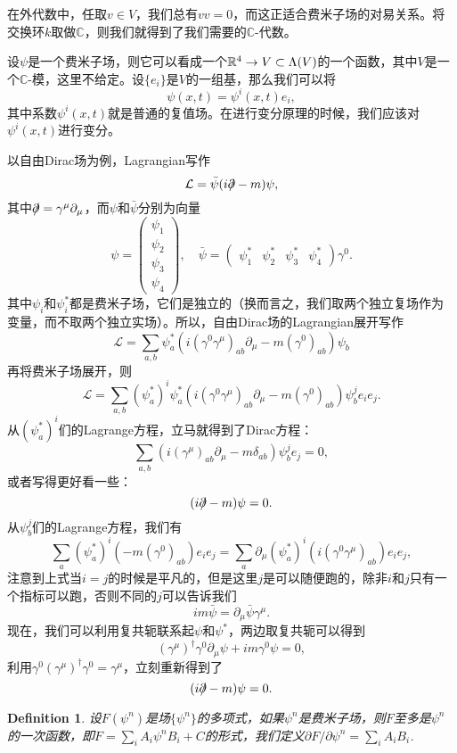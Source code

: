 \documentclass[11pt]{article}
\theoremstyle{definition}
\theoremstyle{plain}
\newtheorem{defi}[para]{Definition}
\begin{document}
在外代数中，任取$v\in V$，我们总有$vv=0$，而这正适合费米子场的对易关系。将交换环$k$取做$\mathbb C$，则我们就得到了我们需要的$\mathbb C$-代数。

设$\psi$是一个费米子场，则它可以看成一个$\mathbb{R}^4\to V\subset \Lambda(V)$的一个函数，其中$V$是一个$\mathbb C$-模，这里不给定。设$\{e_i\}$是$V$的一组基，那么我们可以将
\[
	\psi(x,t)=\psi^i(x,t)e_i,
\]
其中系数$\psi^i(x,t)$就是普通的复值场。在进行变分原理的时候，我们应该对$\psi^i(x,t)$进行变分。

以自由Dirac场为例，Lagrangian写作
\[
	\mathcal L=\bar\psi(i\partial\!\!\!/-m)\psi,
\]
其中$\partial\!\!\!/=\gamma^\mu\partial_\mu$，而$\psi$和$\bar\psi$分别为向量
\[
	\psi=\begin{pmatrix}
		\psi_1\\
		\psi_2\\
		\psi_3\\
		\psi_4
	\end{pmatrix},\quad \bar\psi=\begin{pmatrix}
		\psi_1^*&
		\psi_2^*&
		\psi_3^*&
		\psi_4^*
	\end{pmatrix}\gamma^0.
\]
其中$\psi_i$和$\psi_i^*$都是费米子场，它们是独立的（换而言之，我们取两个独立复场作为变量，而不取两个独立实场）。所以，自由Dirac场的Lagrangian展开写作
\[
	\mathcal L=\sum_{a,b}\psi^*_a(i(\gamma^0\gamma^\mu)_{ab}\partial_\mu-m(\gamma^0)_{ab})\psi_b
\]
再将费米子场展开，则
\[
	\mathcal L=\sum_{a,b}(\psi^*_a)^i\psi^*_a(i(\gamma^0\gamma^\mu)_{ab}\partial_\mu-m(\gamma^0)_{ab})\psi_b^j e_ie_j.
\]
从$(\psi^*_a)^i$们的Lagrange方程，立马就得到了Dirac方程：
\[
	\sum_{a,b}(i(\gamma^\mu)_{ab}\partial_\mu-m\delta_{ab})\psi_b^j e_j=0,
\]
或者写得更好看一些：
\[
	(i\partial\!\!\!/-m)\psi=0.
\]
从$\psi_b^j$们的Lagrange方程，我们有
\[
	\sum_{a}(\psi^*_a)^i(-m(\gamma^0)_{ab})e_ie_j=\sum_a \partial_\mu(\psi^*_a)^i(i(\gamma^0\gamma^\mu)_{ab})e_ie_j,
\]
注意到上式当$i=j$的时候是平凡的，但是这里$j$是可以随便跑的，除非$i$和$j$只有一个指标可以跑，否则不同的$j$可以告诉我们
\[
	im \bar\psi=\partial_\mu \bar\psi \gamma^\mu.
\]
现在，我们可以利用复共轭联系起$\psi$和$\psi^*$，两边取复共轭可以得到
\[
	(\gamma^\mu)^\dagger\gamma^0\partial_\mu\psi+im\gamma^0\psi=0,
\]
利用$\gamma^0 (\gamma^\mu)^\dagger\gamma^0=\gamma^\mu$，立刻重新得到了
\[
	(i\partial\!\!\!/-m)\psi=0.
\]

\begin{defi}
	设$F(\psi^n)$是场$\{\psi^n\}$的多项式，如果$\psi^n$是费米子场，则$F$至多是$\psi^n$的一次函数，即$F=\sum_i A_i\psi^nB_i+C$的形式，我们定义$\partial F/\partial \psi^n=\sum_i A_iB_i$.
\end{defi}
\end{document}
